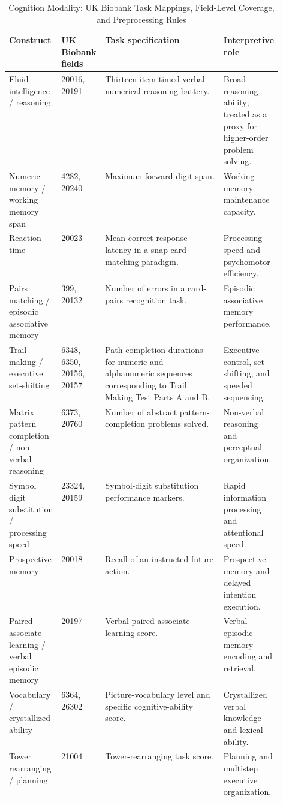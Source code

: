 \documentclass[11pt,a4paper,twoside]{article}
\begin{document}
\begin{table}[H]
\caption{Cognition Modality: UK Biobank Task Mappings, Field-Level Coverage, and Preprocessing Rules}
\label{tab:s14}
\footnotesize
\begin{tabularx}{\linewidth}{p{0.18\linewidth} p{0.16\linewidth} X p{0.19\linewidth}}
\toprule
Construct & UK Biobank fields & Task specification & Interpretive role \\
\midrule
Fluid intelligence / reasoning & 20016, 20191 & Thirteen-item timed verbal-numerical reasoning battery. & Broad reasoning ability; treated as a proxy for higher-order problem solving. \\
Numeric memory / working memory span & 4282, 20240 & Maximum forward digit span. & Working-memory maintenance capacity. \\
Reaction time & 20023 & Mean correct-response latency in a snap card-matching paradigm. & Processing speed and psychomotor efficiency. \\
Pairs matching / episodic associative memory & 399, 20132 & Number of errors in a card-pairs recognition task. & Episodic associative memory performance. \\
Trail making / executive set-shifting & 6348, 6350, 20156, 20157 & Path-completion durations for numeric and alphanumeric sequences corresponding to Trail Making Test Parts A and B. & Executive control, set-shifting, and speeded sequencing. \\
Matrix pattern completion / non-verbal reasoning & 6373, 20760 & Number of abstract pattern-completion problems solved. & Non-verbal reasoning and perceptual organization. \\
Symbol digit substitution / processing speed & 23324, 20159 & Symbol-digit substitution performance markers. & Rapid information processing and attentional speed. \\
Prospective memory & 20018 & Recall of an instructed future action. & Prospective memory and delayed intention execution. \\
Paired associate learning / verbal episodic memory & 20197 & Verbal paired-associate learning score. & Verbal episodic-memory encoding and retrieval. \\
Vocabulary / crystallized ability & 6364, 26302 & Picture-vocabulary level and specific cognitive-ability score. & Crystallized verbal knowledge and lexical ability. \\
Tower rearranging / planning & 21004 & Tower-rearranging task score. & Planning and multistep executive organization. \\

\end{tabularx}
\end{table}
\end{document}
